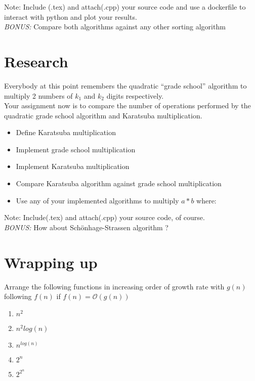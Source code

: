 \documentclass[12pt]{article}
\begin{document}
Note: Include (.tex) and attach(.cpp) your source code and use a dockerfile to interact with python and plot your results.\\

\emph{BONUS:} Compare both algorithms against any other sorting algorithm

\section{Research}

Everybody at this point remembers the quadratic ``grade school'' algorithm to multiply 2 numbers of $k_{1}$ and $k_{2}$ digits respectively. \\

Your assignment now is to compare the number of operations performed by the quadratic grade school algorithm and Karatsuba multiplication.

\begin{itemize}
    \item Define Karatsuba multiplication
    \item Implement grade school multiplication
    \item Implement Karatsuba multiplication
    \item Compare Karatsuba algorithm against grade school multiplication
    \item Use any of your implemented algorithms to multiply $a*b$ where:
\end{itemize}

Note: Include(.tex) and attach(.cpp) your source code, of course.\\

\emph{BONUS:} How about Sch\"{o}nhage-Strassen algorithm ? 

\section{Wrapping up}

Arrange the following functions in increasing order of growth rate with $g(n)$ following $f(n)$ if $f(n) = \mathcal{O}(g(n))$

\begin{enumerate}
    \item $n^{2}$
    \item $n^{2}log(n)$
    \item $n^{log(n)}$
    \item $2^{n}$
    \item $2^{2^{n}}$
\end{enumerate}
\end{document}
